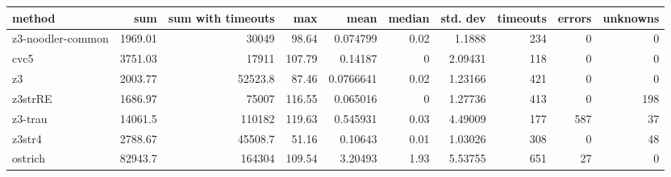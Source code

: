 \begin{tabular}{lrrrrrrrrr}
\hline
 method            &      sum &   sum with timeouts &    max &      mean &   median &   std. dev &   timeouts &   errors &   unknowns \\
\hline
 z3-noodler-common &  1969.01 &             30049   &  98.64 & 0.074799  &     0.02 &    1.1888  &        234 &        0 &          0 \\
 cvc5              &  3751.03 &             17911   & 107.79 & 0.14187   &     0    &    2.09431 &        118 &        0 &          0 \\
 z3                &  2003.77 &             52523.8 &  87.46 & 0.0766641 &     0.02 &    1.23166 &        421 &        0 &          0 \\
 z3strRE           &  1686.97 &             75007   & 116.55 & 0.065016  &     0    &    1.27736 &        413 &        0 &        198 \\
 z3-trau           & 14061.5  &            110182   & 119.63 & 0.545931  &     0.03 &    4.49009 &        177 &      587 &         37 \\
 z3str4            &  2788.67 &             45508.7 &  51.16 & 0.10643   &     0.01 &    1.03026 &        308 &        0 &         48 \\
 ostrich           & 82943.7  &            164304   & 109.54 & 3.20493   &     1.93 &    5.53755 &        651 &       27 &          0 \\
\hline
\end{tabular}
